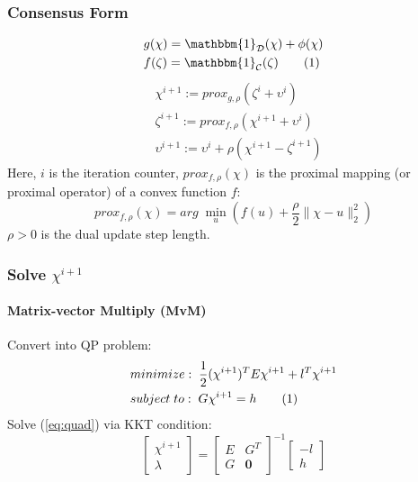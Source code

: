 \documentclass{beamer}
\newcommand\numberthis{\addtocounter{equation}{1}\tag{\theequation}}
\begin{document}
\begin{frame}  
\frametitle{Consensus Form}
\begin{align*}
&g(\chi)=\mathbbm{1}_{\mathcal{D}}(\chi)+\phi(\chi)\\
&f(\zeta)=\mathbbm{1}_{\mathcal{C}}(\zeta) 
\numberthis \label{eq:gf}
\end{align*}
\begin{align}
&\chi^{i+1}:=prox_{g,\rho}(\zeta^i+\upsilon^i)\label{eq:xi}\\
&\zeta^{i+1}:=prox_{f,\rho}(\chi^{i+1}+\upsilon^i)\label{eq:zi}\\
&\upsilon^{i+1}:=\upsilon^i+\rho (\chi^{i+1}-\zeta^{i+1})\label{eq:vi}
\end{align}
Here, $i$ is the iteration counter, $prox_{f,\rho}(\chi)$ is the proximal mapping (or proximal operator) of a convex function $f$: 
\begin{equation*}
prox_{f,\rho}(\chi)=arg\;\underset{u}{\min}(f(u)+\frac{\rho}{2}\| \chi-u\| _2^2)
\end{equation*}
$\rho>0$ is the dual update step length. 

\end{frame}

\begin{frame}
\frametitle{Solve $\chi^{i+1}$}
\framesubtitle{Matrix-vector Multiply (MvM)}
Convert into QP problem:
\begin{align*}
&minimize:\;  \frac{1}{2} ({\chi^{i+1}})^{T}E\chi^{i+1}+l^T\chi^{i+1}\\
 &subject\;  to:\; G\chi^{i+1}=h
\numberthis \label{eq:quad}
\end{align*}
Solve (\ref{eq:quad}) via KKT condition:
\begin{equation}
\begin{bmatrix}
\chi^{i+1} \\
\lambda 
\end{bmatrix}=
\begin{bmatrix}
E&G^T\\
G&\textbf{0} 
\end{bmatrix}^{-1}
\begin{bmatrix}
-l\\
h
\end{bmatrix}
\label{eq:sol}
\end{equation}
\end{frame}
\end{document}
